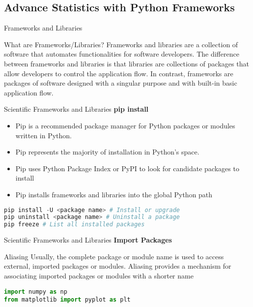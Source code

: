 \documentclass{beamer}
\begin{document}
    \subsection{Advance Statistics with Python Frameworks}
    \begin{frame}[fragile]{Frameworks and Libraries}
        \begin{block}{What are Frameworks/Libraries?}
            Frameworks and libraries are a collection of software that automates functionalities for software developers. The difference between frameworks and libraries is that libraries are collections of packages that allow developers to control the application flow. In contrast, frameworks are packages of software designed with a singular purpose and with built-in basic application flow.
        \end{block}
    \end{frame}

    \begin{frame}[fragile]{Scientific Frameworks and Libraries}
        \textbf{pip install}
        \begin{itemize}
            \item Pip is a recommended package manager for Python packages or modules written in Python.
            \item Pip represents the majority of installation in Python's space.
            \item Pip uses Python Package Index or PyPI to look for candidate packages to install
            \item Pip installs frameworks and libraries into the global Python path
        \end{itemize}
        \begin{example}
            \begin{lstlisting}[language=Python]
pip install -U <package name> # Install or upgrade
pip uninstall <package name> # Uninstall a package
pip freeze # List all installed packages
            \end{lstlisting}
        \end{example}
    \end{frame}

    \begin{frame}[fragile]{Scientific Frameworks and Libraries}
        \textbf{Import Packages}
        \begin{block}{Aliasing}
            Usually, the complete package or module name is used to access external, imported packages or modules. Aliasing provides a mechanism for associating imported packages or modules with a shorter name
        \end{block}
        \begin{example}
            \lstinline[language=Python]{import numpy as np} \\
            \lstinline[language=Python]{from matplotlib import pyplot as plt}
        \end{example}
    \end{frame}
\end{document}
